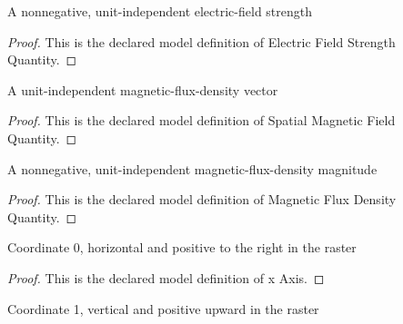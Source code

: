 \begin{definition}
  \label{def:physics:phyx-mini-0958:phyxminiproblems-problemphyxmini0958-electricfieldstrengthquantity}
  A nonnegative, unit-independent electric-field strength
\end{definition}
\begin{proof}
  This is the declared model definition of Electric Field Strength Quantity.
\end{proof}
\begin{definition}
  \label{def:physics:phyx-mini-0958:phyxminiproblems-problemphyxmini0958-spatialmagneticfieldquantity}
  A unit-independent magnetic-flux-density vector
\end{definition}
\begin{proof}
  This is the declared model definition of Spatial Magnetic Field Quantity.
\end{proof}
\begin{definition}
  \label{def:physics:phyx-mini-0958:phyxminiproblems-problemphyxmini0958-magneticfluxdensityquantity}
  A nonnegative, unit-independent magnetic-flux-density magnitude
\end{definition}
\begin{proof}
  This is the declared model definition of Magnetic Flux Density Quantity.
\end{proof}
\begin{definition}[x Axis]
  \label{def:physics:phyx-mini-0958:phyxminiproblems-problemphyxmini0958-xaxis}
  Coordinate 0, horizontal and positive to the right in the raster
\end{definition}
\begin{proof}
  This is the declared model definition of x Axis.
\end{proof}
\begin{definition}[y Axis]
  \label{def:physics:phyx-mini-0958:phyxminiproblems-problemphyxmini0958-yaxis}
  Coordinate 1, vertical and positive upward in the raster
\end{definition}
